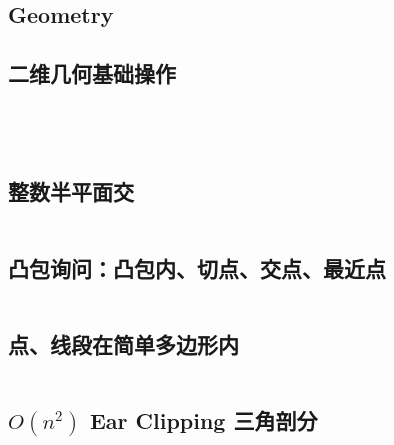\documentclass[titlepage, a4paper]{article}
\begin{document}
	\begin{titlepage}
		
	\end{titlepage}
	\begin{multicols}{2}
		\setcounter{tocdepth}{3}
		\begingroup
		\let\cleardoublepage\relax
		\let\clearpage\relax
		\begin{small}
		\begin{spacing}{0.70}
		\tableofcontents
		\end{spacing}
		\end{small}
		\newpage
		\begin{spacing}{0.6}
			
			\section{Geometry}
				\subsection{二维几何基础操作}
					\inputminted{cpp}{src/Geometry/凸包.cpp}
					\inputminted{cpp}{src/Geometry/闵可夫斯基和.cpp}
					\inputminted{cpp}{src/Geometry/geo.cpp}
					\inputminted{cpp}{src/Geometry/半平面交.cpp}
				\subsection{整数半平面交}
					\inputminted{cpp}{src/Geometry/integral_hpi.cpp}
				\subsection{凸包询问：凸包内、切点、交点、最近点}
					\inputminted{cpp}{src/Geometry/convex_findmax.cpp}
				

				
				 \subsection{点、线段在简单多边形内}
					\inputminted{cpp}{src/Geometry/AirportConstruction.cpp}
				\subsection{$O(n ^ 2)$ Ear Clipping 三角剖分}
				\inputminted{cpp}{src/Geometry/Triangulation.cpp}

\end{spacing}
\end{multicols}
\end{document}

